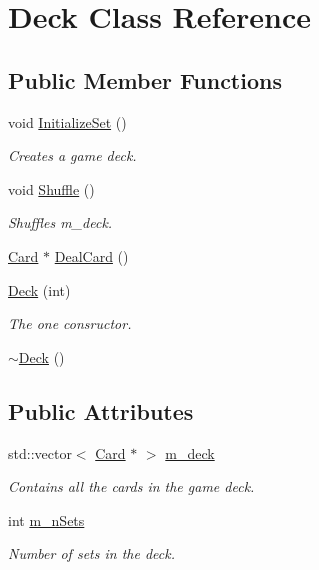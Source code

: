 \hypertarget{class_deck}{}\section{Deck Class Reference}
\label{class_deck}
\subsection*{Public Member Functions}
\begin{DoxyCompactItemize}
\item 
void \hyperlink{class_deck_a0fea69180a61a2bb810ca18698ebc119}{Initialize\+Set} ()
\begin{DoxyCompactList}\small\item\em Creates a game deck. \end{DoxyCompactList}\item 
void \hyperlink{class_deck_a1ed471063f40cb91c7e6786aa21737ef}{Shuffle} ()
\begin{DoxyCompactList}\small\item\em Shuffles m\+\_\+deck. \end{DoxyCompactList}\item 
\hyperlink{class_card}{Card} $\ast$ \hyperlink{class_deck_af4e4938969948cb4a471655cc4da3c90}{Deal\+Card} ()
\item 
\hyperlink{class_deck_a5487610d44f13d27ef54c930e2bdadf9}{Deck} (int)
\begin{DoxyCompactList}\small\item\em The one consructor. \end{DoxyCompactList}\item 
\hyperlink{class_deck_a7d1331cc558c302fdf44e5ae8aae1a95}{$\sim$\+Deck} ()
\end{DoxyCompactItemize}
\subsection*{Public Attributes}
\begin{DoxyCompactItemize}
\item 
std\+::vector$<$ \hyperlink{class_card}{Card} $\ast$ $>$ \hyperlink{class_deck_a6a52e509c5e9f7a6154bd27c09ab8d5e}{m\+\_\+deck}
\begin{DoxyCompactList}\small\item\em Contains all the cards in the game deck. \end{DoxyCompactList}\item 
int \hyperlink{class_deck_af52c03d790a3182c7325d528839cd640}{m\+\_\+n\+Sets}
\begin{DoxyCompactList}\small\item\em Number of sets in the deck. \end{DoxyCompactList}\end{DoxyCompactItemize}


